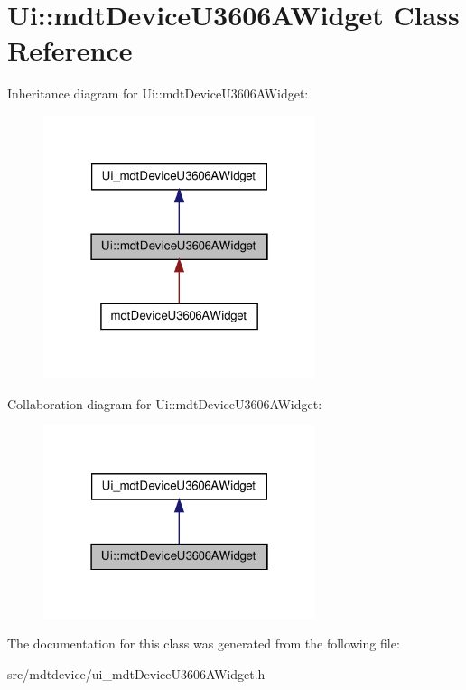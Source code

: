 \hypertarget{class_ui_1_1mdt_device_u3606_a_widget}{
\section{Ui::mdtDeviceU3606AWidget Class Reference}
\label{class_ui_1_1mdt_device_u3606_a_widget}
}


Inheritance diagram for Ui::mdtDeviceU3606AWidget:
\nopagebreak
\begin{figure}[H]
\begin{center}
\leavevmode
\includegraphics[width=226pt]{class_ui_1_1mdt_device_u3606_a_widget__inherit__graph}
\end{center}
\end{figure}


Collaboration diagram for Ui::mdtDeviceU3606AWidget:
\nopagebreak
\begin{figure}[H]
\begin{center}
\leavevmode
\includegraphics[width=226pt]{class_ui_1_1mdt_device_u3606_a_widget__coll__graph}
\end{center}
\end{figure}


The documentation for this class was generated from the following file:\begin{DoxyCompactItemize}
\item 
src/mdtdevice/ui\_\-mdtDeviceU3606AWidget.h\end{DoxyCompactItemize}
